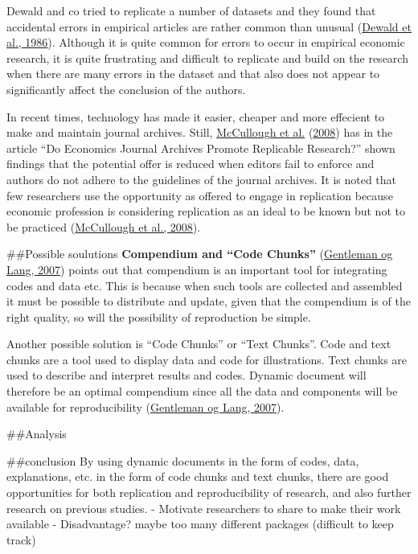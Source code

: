 \documentclass[
  12pt,
  norsk,
]{article}
\begin{document}
Dewald and co tried to replicate a number of datasets and they found
that accidental errors in empirical articles are rather common than
unusual (\protect\hyperlink{ref-dewald1986}{Dewald et al., 1986}).
Although it is quite common for errors to occur in empirical economic
research, it is quite frustrating and difficult to replicate and build
on the research when there are many errors in the dataset and that also
does not appear to significantly affect the conclusion of the authors.

In recent times, technology has made it easier, cheaper and more
effecient to make and maintain journal archives. Still,
\protect\hyperlink{ref-mccullough2008}{McCullough et al.}
(\protect\hyperlink{ref-mccullough2008}{2008}) has in the article ``Do
Economics Journal Archives Promote Replicable Research?'' shown findings
that the potential offer is reduced when editors fail to enforce and
authors do not adhere to the guidelines of the journal archives. It is
noted that few researchers use the opportunity as offered to engage in
replication because economic profession is considering replication as an
ideal to be known but not to be practiced
(\protect\hyperlink{ref-mccullough2008}{McCullough et al., 2008}).

\#\#Possible soulutions \textbf{Compendium and ``Code Chunks''}
(\protect\hyperlink{ref-gentleman2007}{Gentleman og Lang, 2007}) points
out that compendium is an important tool for integrating codes and data
etc. This is because when such tools are collected and assembled it must
be possible to distribute and update, given that the compendium is of
the right quality, so will the possibility of reproduction be simple.

Another possible solution is ``Code Chunks'' or ``Text Chunks''. Code
and text chunks are a tool used to display data and code for
illustrations. Text chunks are used to describe and interpret results
and codes. Dynamic document will therefore be an optimal compendium
since all the data and components will be available for reproducibility
(\protect\hyperlink{ref-gentleman2007}{Gentleman og Lang, 2007}).

\#\#Analysis

\#\#conclusion By using dynamic documents in the form of codes, data,
explanations, etc. in the form of code chunks and text chunks, there are
good opportunities for both replication and reproducibility of research,
and also further research on previous studies. - Motivate researchers to
share to make their work available - Disadvantage? maybe too many
different packages (difficult to keep track)
\end{document}
